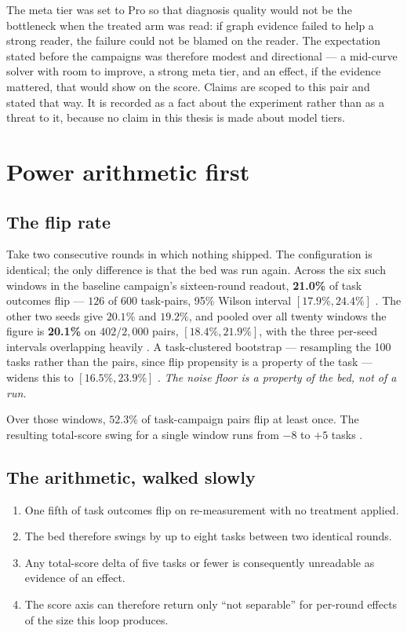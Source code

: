 The meta tier was set to Pro so that diagnosis quality would not be the
bottleneck when the treated arm was read: if graph evidence failed to help
a strong reader, the failure could not be blamed on the reader. The
expectation stated before the campaigns was therefore modest and
directional --- a mid-curve solver with room to improve, a strong meta
tier, and an effect, if the evidence mattered, that would show on the
score. Claims are scoped to this pair and stated that way. It is recorded
as a fact about the experiment rather than as a threat to it, because no
claim in this thesis is made about model tiers.

\section{Power arithmetic first}
\label{sec:power}

\subsection*{The flip rate}

Take two consecutive rounds in which nothing shipped. The configuration is
identical; the only difference is that the bed was run again. Across the
six such windows in the baseline campaign's sixteen-round readout,
\textbf{21.0\%} of task outcomes flip --- $126$ of $600$ task-pairs, 95\%
Wilson interval $[17.9\%, 24.4\%]$ . The other two seeds give
$20.1\%$ and $19.2\%$, and pooled over all twenty windows the figure is
\textbf{20.1\%} on $402/2{,}000$ pairs, $[18.4\%, 21.9\%]$, with the three
per-seed intervals overlapping heavily . A task-clustered bootstrap
--- resampling the 100 tasks rather than the pairs, since flip propensity
is a property of the task --- widens this to $[16.5\%, 23.9\%]$ .
\emph{The noise floor is a property of the bed, not of a run.}

Over those windows, $52.3\%$ of task-campaign pairs flip at least once.
The resulting total-score swing for a single window runs from $-8$ to
$+5$ tasks .

\subsection*{The arithmetic, walked slowly}

\begin{enumerate}
  \item One fifth of task outcomes flip on re-measurement with no treatment
        applied.
  \item The bed therefore swings by up to eight tasks between two
        identical rounds.
  \item Any total-score delta of five tasks or fewer is consequently
        unreadable as evidence of an effect.
  \item The score axis can therefore return only ``not separable'' for
        per-round effects of the size this loop produces.
\end{enumerate}

